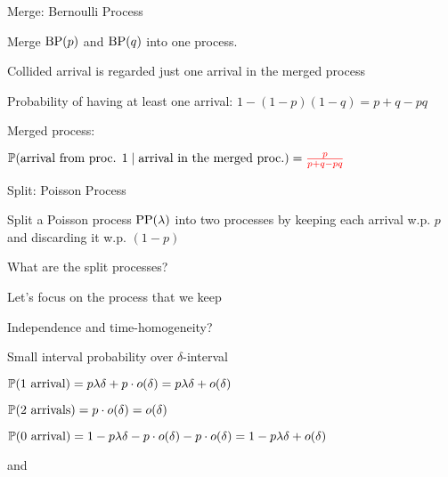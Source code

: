 \begin{frame}{Merge: Bernoulli Process}

\plitemsep 0.05in
\bci
\item Merge $\text{BP}(p)$ and $\text{BP}(q)$ into one process.

\item<2-> Collided arrival is regarded just one arrival in the merged process

\item<3-> Probability of having at least one arrival: $1-(1-p)(1-q) = p+q-pq$
    

\item<4-> Merged process: 

  \item<5-> $\mathbb{P}( \text{arrival from proc. 1} \mid \text{arrival in
        the merged proc.} ) = {\color{red} \frac{p}{p+ q - pq}}$ 
  \eci

\vspace{-0.5cm}


\end{frame}

\begin{frame}{Split: Poisson Process}

\plitemsep 0.07in
\bci
\item Split a Poisson process $\text{PP}(\lambda)$ into two processes by
  keeping each arrival w.p. $p$ and discarding it w.p. $(1-p)$

\item<2-> \question What are the split processes?

\item<3-> Let's focus on the process that we keep

\item<4-> Independence and time-homogeneity?   
\item<5-> Small interval probability over $\delta$-interval
  \bci
  \item<6->$\mathbb{P}( \text{1 arrival} ) = p \lambda \delta +
    p\cdot o(\delta) = p\lambda \delta + o(\delta)$
  \item<6-> $\mathbb{P}( \text{2 arrivals} ) = p \cdot o(\delta) = o(\delta)$ 
  \item<6-> $\mathbb{P}( \text{0 arrival} ) = 1 - p \lambda \delta -
    p\cdot o(\delta) - p \cdot o(\delta) = 1 - p\lambda \delta + o(\delta)$ 
    \eci

\item<6->  and      
\eci
\end{frame}



